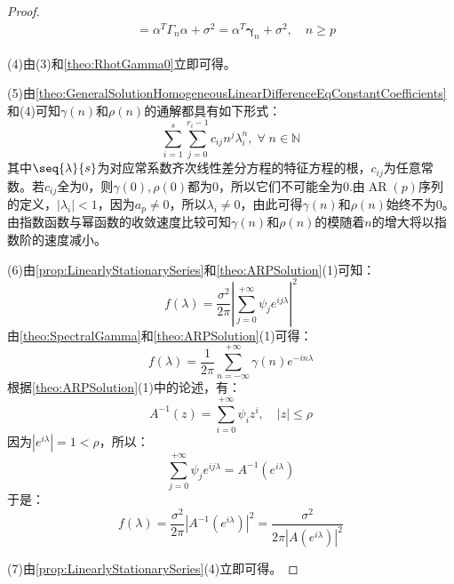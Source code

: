\begin{proof}
\begin{align*}
		&=\alpha^T\Gamma_n\alpha+\sigma^2=\alpha^T\boldsymbol{\gamma}_n+\sigma^2,\quad n\geqslant p
	\end{align*}\par
	(4)由(3)和\cref{theo:RhotGamma0}立即可得。\par
	(5)由\cref{theo:GeneralSolutionHomogeneousLinearDifferenceEqConstantCoefficients}和(4)可知$\gamma(n)$和$\rho(n)$的通解都具有如下形式：
	\begin{equation*}
		\sum_{i=1}^{s}\sum_{j=0}^{r_i-1}c_{ij}n^{j}\lambda_i^n,\;\forall\;n\in\mathbb{N}
	\end{equation*}
	其中$\seq{\lambda}{s}$为对应常系数齐次线性差分方程的特征方程的根，$c_{ij}$为任意常数。若$c_{ij}$全为$0$，则$\gamma(0),\rho(0)$都为$0$，所以它们不可能全为$0$.由$\operatorname{AR}(p)$序列的定义，$|\lambda_i|<1$，因为$a_p\ne0$，所以$\lambda_i\ne0$，由此可得$\gamma(n)$和$\rho(n)$始终不为$0$。由指数函数与幂函数的收敛速度比较可知$\gamma(n)$和$\rho(n)$的模随着$n$的增大将以指数阶的速度减小。\par
	(6)由\cref{prop:LinearlyStationarySeries}和\cref{theo:ARPSolution}(1)可知：
	\begin{equation*}
		f(\lambda)=\frac{\sigma^2}{2\pi}\left|\sum_{j=0}^{+\infty}\psi_je^{ij\lambda}\right|^2
	\end{equation*}
	由\cref{theo:SpectralGamma}和\cref{theo:ARPSolution}(1)可得：
	\begin{equation*}
		f(\lambda)=\frac{1}{2\pi}\sum_{n=-\infty}^{+\infty}\gamma(n)e^{-in\lambda}
	\end{equation*}
	根据\cref{theo:ARPSolution}(1)中的论述，有：
	\begin{equation*}
		A^{-1}(z)=\sum_{i=0}^{+\infty}\psi_iz^i,\quad|z|\leqslant\rho
	\end{equation*}
	因为$|e^{i\lambda}|=1<\rho$，所以：
	\begin{equation*}
		\sum_{j=0}^{+\infty}\psi_je^{ij\lambda}=A^{-1}(e^{i\lambda})
	\end{equation*}
	于是：
	\begin{equation*}
		f(\lambda)=\frac{\sigma^2}{2\pi}\left|A^{-1}(e^{i\lambda})\right|^2=\frac{\sigma^2}{2\pi|A(e^{i\lambda})|^2}
	\end{equation*}\par
	(7)由\cref{prop:LinearlyStationarySeries}(4)立即可得。
\end{proof}

